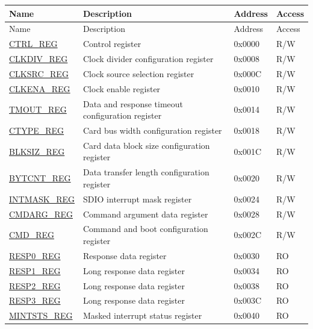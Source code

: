 \begin{longtable}{ | p{4cm} | p{7.5cm} | p{2cm} | p{1cm} | }
\hline
\rowcolor{lightgray}
Name & Description &  Address & Access \\\hline
        \endfirsthead
        \hline
        \rowcolor{lightgray}
Name & Description &  Address & Access \\\hline
        \endhead
        \endfoot
\hyperref[regdesc:CTRLREG]{CTRL\_REG} & Control register & 0x0000 & R/W \\ \hline
\hyperref[regdesc:CLKDIVREG]{CLKDIV\_REG} & Clock divider configuration register & 0x0008 & R/W \\ \hline
\hyperref[regdesc:CLKSRCREG]{CLKSRC\_REG} & Clock source selection register & 0x000C & R/W \\ \hline
\hyperref[regdesc:CLKENAREG]{CLKENA\_REG} & Clock enable register & 0x0010 & R/W \\ \hline
\hyperref[regdesc:TMOUTREG]{TMOUT\_REG} & Data and response timeout configuration register & 0x0014 & R/W \\ \hline
\hyperref[regdesc:CTYPEREG]{CTYPE\_REG} & Card bus width configuration register & 0x0018 & R/W \\ \hline
\hyperref[regdesc:BLKSIZREG]{BLKSIZ\_REG} & Card data block size configuration register & 0x001C & R/W \\ \hline
\hyperref[regdesc:BYTCNTREG]{BYTCNT\_REG} & Data transfer length configuration register & 0x0020 & R/W \\ \hline
\hyperref[regdesc:INTMASKREG]{INTMASK\_REG} & SDIO interrupt mask register & 0x0024 & R/W \\ \hline
\hyperref[regdesc:CMDARGREG]{CMDARG\_REG} & Command argument data register & 0x0028 & R/W \\ \hline
\hyperref[regdesc:CMDREG]{CMD\_REG} & Command and boot configuration register & 0x002C & R/W \\ \hline
\hyperref[regdesc:RESP0REG]{RESP0\_REG} & Response data register& 0x0030 & RO \\ \hline
\hyperref[regdesc:RESP1REG]{RESP1\_REG} & Long response data register & 0x0034 & RO \\ \hline
\hyperref[regdesc:RESP2REG]{RESP2\_REG} & Long response data register & 0x0038 & RO \\ \hline
\hyperref[regdesc:RESP3REG]{RESP3\_REG} & Long response data register & 0x003C & RO \\ \hline
\hyperref[regdesc:MINTSTSREG]{MINTSTS\_REG} & Masked interrupt status register& 0x0040 & RO \\ \hline

\end{longtable}
